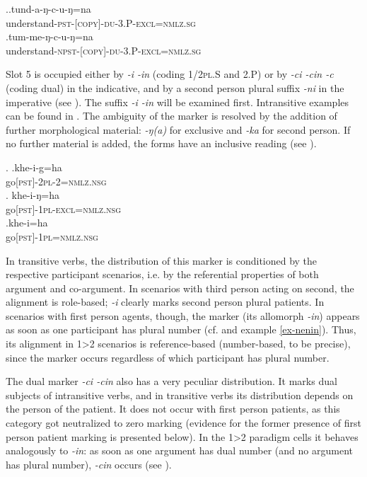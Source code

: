 \ex.\ag.tund-a-ŋ-c-u-ŋ=na\\
understand{\scshape -pst-[copy]-du-3.P-excl=nmlz.sg}\\
\bg.tum-me-ŋ-c-u-ŋ=na\\
understand{\scshape -npst-[copy]-du-3.P-excl=nmlz.sg}\\

Slot 5 is occupied either by \emph{-i \ti -in} (coding {\scshape 1/2pl.S} and {\scshape 2.P}) or by \emph{-ci \ti -cin \ti -c} (coding dual) in the indicative, and by a second person plural suffix \emph{-ni} in the imperative (see ). The suffix \emph{-i \ti -in} will be examined first. Intransitive examples can be found in \Next. The ambiguity of the marker is resolved by the addition of further morphological material: \emph{-ŋ(a)} for exclusive and \emph{-ka} for second person. If no further material is added, the forms have an inclusive reading (see \Next[c]).

	\ex. \ag.khe-i-g=ha\\
	go{\scshape [pst]-2pl-2=nmlz.nsg}\\
	\bg. khe-i-ŋ=ha\\
	go{\scshape [pst]-1pl-excl=nmlz.nsg}\\
	\bg.khe-i=ha\\
	go{\scshape [pst]-1pl=nmlz.nsg}\\

In transitive verbs, the distribution of this marker is conditioned by the respective participant  scenarios, i.e. by the referential properties of both argument and co-argument. In scenarios with third person acting on second, the alignment is role-based; \emph{-i} clearly marks second person plural patients. In scenarios with first person agents, though, the marker (its allomorph \emph{-in}) appears as soon as one parti\-cipant has plural number (cf.  and example \ref{ex-nenin}). Thus, its alignment in 1>2 scenarios is reference-based (number-based, to be precise), since the marker occurs regardless of which participant has plural number. 

The dual marker \emph{-ci \ti -cin} also has a very peculiar distribution. It marks dual subjects of intransitive verbs, and in transitive verbs its distribution  depends on the person of the patient. It does not occur with first person patients, as this category got neutralized to zero marking (evidence for the former presence of first person patient marking is presented below). In the 1>2 paradigm cells it behaves analogously to \emph{-in}: as soon as one argument has dual number (and no argument has plural number), \emph{-cin} occurs (see \Next). 

